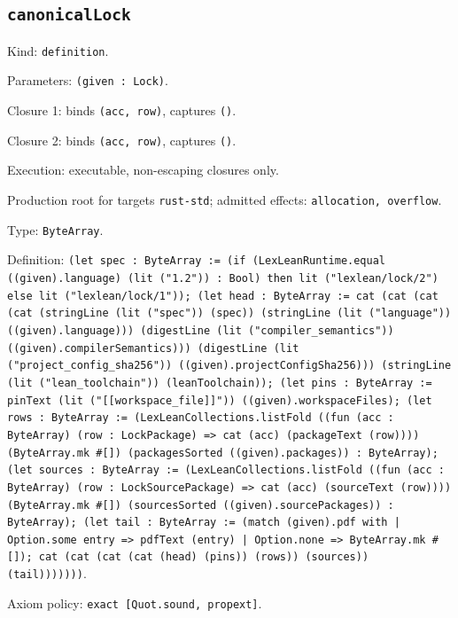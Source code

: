 \documentclass[11pt]{article}
\begin{document}
\subsection*{\texttt{canonicalLock}}
\noindent Kind: \texttt{definition}.\par
\noindent Parameters: \texttt{(given : Lock)}.\par
\noindent Closure 1: binds \texttt{(acc, row)}, captures \texttt{()}.\par
\noindent Closure 2: binds \texttt{(acc, row)}, captures \texttt{()}.\par
\noindent Execution: executable, non-escaping closures only.\par
\noindent Production root for targets \texttt{rust-std}; admitted effects: \texttt{allocation, overflow}.\par
\noindent Type: \texttt{ByteArray}.\par
\noindent Definition: \texttt{(let spec : ByteArray := (if (LexLeanRuntime.equal ((given).language) (lit ("1.2")) : Bool) then lit ("lexlean/lock/2") else lit ("lexlean/lock/1")); (let head : ByteArray := cat (cat (cat (cat (stringLine (lit ("spec")) (spec)) (stringLine (lit ("language")) ((given).language))) (digestLine (lit ("compiler\_semantics")) ((given).compilerSemantics))) (digestLine (lit ("project\_config\_sha256")) ((given).projectConfigSha256))) (stringLine (lit ("lean\_toolchain")) (leanToolchain)); (let pins : ByteArray := pinText (lit ("[[workspace\_file]]")) ((given).workspaceFiles); (let rows : ByteArray := (LexLeanCollections.listFold ((fun (acc : ByteArray) (row : LockPackage) => cat (acc) (packageText (row)))) (ByteArray.mk \#[]) (packagesSorted ((given).packages)) : ByteArray); (let sources : ByteArray := (LexLeanCollections.listFold ((fun (acc : ByteArray) (row : LockSourcePackage) => cat (acc) (sourceText (row)))) (ByteArray.mk \#[]) (sourcesSorted ((given).sourcePackages)) : ByteArray); (let tail : ByteArray := (match (given).pdf with | Option.some entry => pdfText (entry) | Option.none => ByteArray.mk \#[]); cat (cat (cat (cat (head) (pins)) (rows)) (sources)) (tail)))))))}.\par
\noindent Axiom policy: \texttt{exact [Quot.sound, propext]}.\par
\end{document}
